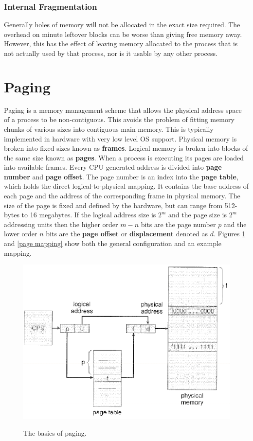 \documentclass[10pt,a4paper]{article}
\begin{document}
\subsubsection{Internal Fragmentation}
Generally holes of memory will not be allocated in the exact size required. The overhead on minute leftover blocks can be worse than giving free memory away. However, this has the effect of leaving memory allocated to the process that is not actually used by that process, nor is it usable by any other process. 
\section{Paging}
Paging is a memory management scheme that allows the physical address space of a process to be non-contiguous. This avoids the problem of fitting memory chunks of various sizes into contiguous main memory. This is typically implemented in hardware with very low level OS support. Physical memory is broken into fixed sizes known as {\bf frames}. Logical memory is broken into blocks of the same size known as {\bf pages}. When a process is executing its pages are loaded into available frames. Every CPU generated address is divided into {\bf page number} and {\bf page offset}. The page number is an index into the {\bf page table}, which holds the direct logical-to-physical mapping. It contains the base address of each page and the address of the corresponding frame in physical memory. The size of the page is fixed and defined by the hardware, but can range from 512-bytes to 16 megabytes. 
\newline\newline
If the logical address size is $2^m$ and the page size is $2^m$ addressing units then the higher order $m-n$ bits are the page number $p$ and the lower order $n$ bits are the {\bf page offset} or {\bf displacement} denoted as $d$. Figures \ref{paging} and \ref{page mapping} show both the general configuration and an example mapping. 
\begin{figure}
\caption{The basics of paging.\cite{OSCONCEPTS}}
\begin{center}
\includegraphics[scale=0.45]{../images/paging.png}
\label{paging}
\end{center}
\end{figure}
\end{document}
